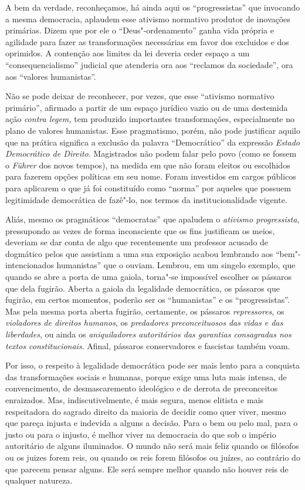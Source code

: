 A bem da verdade, reconheçamos, há ainda aqui os ``progressistas'' que
invocando a mesma democracia, aplaudem esse ativismo normativo produtor
de inovações primárias. Dizem que por ele o ``Deus"-ordenamento''
ganha vida própria e agilidade para fazer as transformações necessárias
em favor dos excluidos e dos oprimidos. A contenção aos limites da lei
deveria ceder espaço a um ``consequencialismo'' judicial que
atenderia ora aos ``reclamos da sociedade'', ora aos
``valores humanistas''.

Não se pode deixar de reconhecer, por vezes, que esse ``ativismo
normativo primário'', afirmado a partir de um espaço jurídico vazio ou
de uma destemida ação \emph{contra legem,} tem produzido importantes
transformações, especialmente no plano de valores humanistas. Esse
pragmatismo, porém, não pode justificar aquilo que na prática significa
a exclusão da palavra ``Democrático'' da expressão \emph{Estado
Democrático de Direito}. Magistrados não podem falar pelo povo (como se
fossem o \emph{Führer} dos novos tempos), na medida em que não foram
eleitos ou escolhidos para fazerem opções políticas em seu nome. Foram
investidos em cargos públicos para aplicarem o que já foi constituído
como ``norma'' por aqueles que possuem legitimidade democrática de
fazê"-lo, nos termos da institucionalidade vigente.

Aliás, mesmo os pragmáticos ``democratas'' que apaludem o \emph{ativismo
progressista,} pressupondo as vezes de forma inconsciente que os fins
justificam os meios, deveriam se dar conta de algo que recentemente um
professor acusado de dogmático pelos que assistiam a uma sua exposição
acabou lembrando aos ``bem"-intencionados humanistas'' que o ouviam.
Lembrou, em um singelo exemplo, que quando se abre a porta de uma
gaiola, torna"-se impossível escolher os pássaros que dela fugirão.
Aberta a gaiola da legalidade democrática, os pássaros que fugirão, em
certos momentos, poderão ser os ``humanistas'' e os
``progressistas''. Mas pela mesma porta aberta fugirão,
certamente, os pássaros \emph{repressores}, os \emph{violadores de
direitos humanos}, os \emph{predadores preconceituosos das vidas e das
liberdades}, ou ainda os \emph{aniquiladores autoritários das garantias
consagradas nos textos constitucionais}. Afinal, pássaros conservadores
e fascistas também voam.

Por isso, o respeito à legalidade democrática pode ser mais lento para a
conquista das transformações sociais e humanas, porque exige uma luta
mais intensa, de convencimento, de desmascaremento ideológico e de
derrota de preconceitos enraizados. Mas, indiscutivelmente, é mais
segura, menos elitista e mais respeitadora do sagrado direito da maioria
de decidir como quer viver, mesmo que pareça injusta e indevida a alguns
a decisão. Para o bem ou pelo mal, para o justo ou para o injusto, é
melhor viver na democracia do que sob o império autoritário de alguns
iluminados. O mundo não será mais feliz quando os filósofos ou os juizes
forem reis, ou quando os reis forem filósofos ou juízes, ao contrário do
que parecem pensar alguns. Ele será sempre melhor quando não houver reis
de qualquer natureza.

